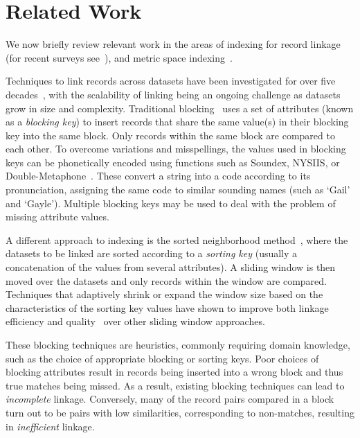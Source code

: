 \documentclass{llncs}
\begin{document}

\section{Related Work}
\label{sec-related}

We now briefly review relevant work in the areas of indexing
for record linkage (for recent surveys see~\cite{Chr12b,Pap16}),
and metric space indexing~\cite{Zezula2010}.

Techniques to link records across datasets have been investigated for
over five decades~\cite{Fel69,New59}, with the scalability of linking
being an ongoing challenge as datasets grow in size and
complexity. Traditional blocking~\cite{Chr12b} uses a set of attributes
(known as a \emph{blocking key}) to insert records that share the same
value(s) in their blocking key into the same block. Only records within
the same block are  compared to each other. To overcome variations and
misspellings, the values used in blocking keys can be phonetically
encoded using functions such as Soundex, NYSIIS, or
Double-Metaphone~\cite{Chr12}. These convert a string into a
code according to its pronunciation, assigning the same code to similar
sounding names (such as `Gail' and `Gayle'). Multiple blocking keys may
be used to deal with the problem of missing attribute values.

A different approach to indexing is the sorted neighborhood
method~\cite{Mon96}, where the datasets to be linked are sorted
according to a \emph{sorting key} (usually a concatenation of the values
from several attributes). A sliding window is then moved over the
datasets and only records within the window are compared. Techniques
that adaptively shrink or expand the window size based on the
characteristics of the sorting key values have shown to improve both
linkage efficiency and quality~\cite{Dra12} over other sliding window
approaches.

These blocking techniques are heuristics, commonly requiring domain
knowledge, such as the choice of appropriate blocking or sorting keys.
Poor choices of blocking attributes result in records being inserted
into a wrong block and thus true matches being missed. As a result,
existing blocking techniques can lead to \emph{incomplete} linkage.
Conversely, many of the record pairs compared in a block turn out to be
pairs with low similarities, corresponding to non-matches, resulting in
\emph{inefficient} linkage.
\end{document}
